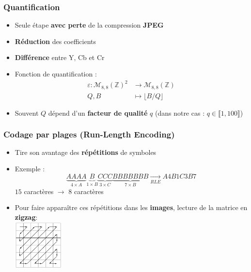 \documentclass[aspectratio=43]{beamer}
\begin{document}
\begin{frame}
    \frametitle{Quantification}

    \begin{itemize}
        \item Seule étape \textbf{avec perte} de la compression \textbf{JPEG}
        \item \textbf{Réduction} des coefficients
        \item \textbf{Différence} entre Y, Cb et Cr
        \item Fonction de quantification : \begin{align*}
            \varepsilon \colon \mathcal{M}_{8,8}(\mathbb{Z})^2 & \rightarrow \mathcal{M}_{8,8}(\mathbb{Z})\\
            Q, B & \longmapsto \lfloor B / Q \rfloor
        \end{align*}
        \item Souvent $Q$ dépend d'un \textbf{facteur de qualité} $q$ (dans notre cas : $q \in \llbracket 1, 100 \rrbracket$)
    \end{itemize}

\end{frame}

\begin{frame}
    \frametitle{Codage par plages (Run-Length Encoding)}    

    \begin{itemize}
        \item Tire son avantage des \textbf{répétitions} de symboles  
        \item Exemple : $$\underbrace{AAAA}_{4 \times A} \underbrace{B}_{1 \times B} \underbrace{CCC}_{3 \times C} \underbrace{BBBBBBB}_{7 \times B} \xrightarrow[RLE]{} A4B1C3B7$$
        $15$ caractères $\rightarrow$ $8$ caractères 
        \item Pour faire apparaître ces répétitions dans les \textbf{images}, lecture de la matrice en \textbf{zigzag}: \\
        \centering\includegraphics[width=0.2\textwidth]{img/zigzag.png}
    \end{itemize}

\end{frame}
\end{document}

